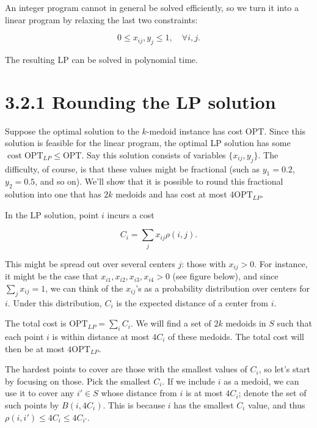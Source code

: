 \documentclass{article}
\begin{document}
An integer program cannot in general be solved efficiently, so we turn it into a linear program by relaxing the last two constraints:

\begin{equation*}
0 \leq x_{i j}, y_{j} \leq 1, \quad \forall i, j.
\end{equation*}

The resulting LP can be solved in polynomial time.

\section*{3.2.1 Rounding the LP solution}

Suppose the optimal solution to the $k$-medoid instance has cost $\text{OPT}$. Since this solution is feasible for the linear program, the optimal LP solution has some $\operatorname{cost} \mathrm{OPT}_{LP} \leq \mathrm{OPT}$. Say this solution consists of variables $\{x_{i j}, y_{j}\}$. The difficulty, of course, is that these values might be fractional (such as $y_{1} = 0.2$, $y_{2} = 0.5$, and so on). We'll show that it is possible to round this fractional solution into one that has $2k$ medoids and has cost at most $4 \mathrm{OPT}_{LP}$.

In the LP solution, point $i$ incurs a cost

\begin{equation*}
C_{i} = \sum_{j} x_{i j} \rho(i, j).
\end{equation*}

This might be spread out over several centers $j$: those with $x_{i j} > 0$. For instance, it might be the case that $x_{i 1}, x_{i 2}, x_{i 3}, x_{i 4} > 0$ (see figure below), and since $\sum_{j} x_{i j} = 1$, we can think of the $x_{i j}$'s as a probability distribution over centers for $i$. Under this distribution, $C_{i}$ is the expected distance of a center from $i$.

The total cost is $\mathrm{OPT}_{LP} = \sum_{i} C_{i}$. We will find a set of $2k$ medoids in $S$ such that each point $i$ is within distance at most $4 C_{i}$ of these medoids. The total cost will then be at most $4 \mathrm{OPT}_{LP}$.

The hardest points to cover are those with the smallest values of $C_{i}$, so let's start by focusing on those. Pick the smallest $C_{i}$. If we include $i$ as a medoid, we can use it to cover any $i' \in S$ whose distance from $i$ is at most $4 C_{i}$; denote the set of such points by $B(i, 4 C_{i})$. This is because $i$ has the smallest $C_{i}$ value, and thus $\rho(i, i') \leq 4 C_{i} \leq 4 C_{i'}$.
\end{document}
